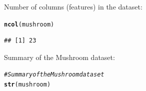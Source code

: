 \documentclass[10pt  ,usenames, dvipsnames]{article}\usepackage[]{graphicx}\usepackage[]{color}
\makeatletter
\newcommand{\hlcom}[1]{\textcolor[rgb]{0.678,0.584,0.686}{\textit{#1}}}%
\newcommand{\hlstd}[1]{\textcolor[rgb]{0.345,0.345,0.345}{#1}}%
\newcommand{\hlkwd}[1]{\textcolor[rgb]{0.737,0.353,0.396}{\textbf{#1}}}%
\newenvironment{kframe}{%
 \def\at@end@of@kframe{}%
 \ifinner\ifhmode%
  \def\at@end@of@kframe{\end{minipage}}%
  \begin{minipage}{\columnwidth}%
 \fi\fi%
 \def\FrameCommand##1{\hskip\@totalleftmargin \hskip-\fboxsep
 \colorbox{shadecolor}{##1}\hskip-\fboxsep
     \hskip-\linewidth \hskip-\@totalleftmargin \hskip\columnwidth}%
 \MakeFramed {\advance\hsize-\width
   \@totalleftmargin\z@ \linewidth\hsize
   \@setminipage}}%
 {\par\unskip\endMakeFramed%
 \at@end@of@kframe}
\newenvironment{knitrout}{}{} %
\makeatother
\begin{document}
Number of columns (features) in the dataset:

\begin{knitrout}
\color{fgcolor}\begin{kframe}
\begin{alltt}
\hlkwd{ncol}\hlstd{(mushroom)}
\end{alltt}
\end{kframe}
\end{knitrout}


\begin{knitrout}
\color{fgcolor}\begin{kframe}
\begin{verbatim}
## [1] 23
\end{verbatim}
\end{kframe}
\end{knitrout}

Summary of the Mushroom dataset:

\begin{knitrout}
\color{fgcolor}\begin{kframe}
\begin{alltt}
\hlcom{#Summary of the Mushroom dataset}
\hlkwd{str}\hlstd{(mushroom)}
\end{alltt}
\end{kframe}
\end{knitrout}
\end{document}
